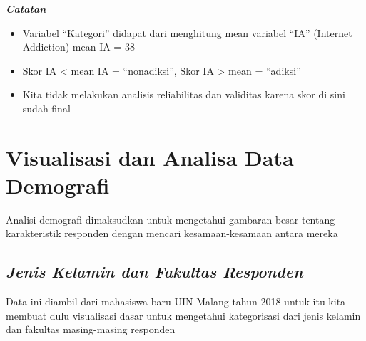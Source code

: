 \documentclass[
]{article}
\providecommand{\tightlist}{%
  \setlength{\itemsep}{0pt}\setlength{\parskip}{0pt}}
\begin{document}
\textbf{\emph{Catatan}}

\begin{itemize}
\tightlist
\item
  Variabel ``Kategori'' didapat dari menghitung mean variabel ``IA''
  (Internet Addiction) mean IA = 38
\item
  Skor IA \textless{} mean IA = ``nonadiksi'', Skor IA \textgreater{}
  mean = ``adiksi''
\item
  Kita tidak melakukan analisis reliabilitas dan validitas karena skor
  di sini sudah final
\end{itemize}

\hypertarget{visualisasi-dan-analisa-data-demografi}{%
\section{\texorpdfstring{\textbf{Visualisasi dan Analisa Data
Demografi}}{Visualisasi dan Analisa Data Demografi}}\label{visualisasi-dan-analisa-data-demografi}}

Analisi demografi dimaksudkan untuk mengetahui gambaran besar tentang
karakteristik responden dengan mencari kesamaan-kesamaan antara mereka

\hypertarget{jenis-kelamin-dan-fakultas-responden}{%
\subsection{\texorpdfstring{\emph{Jenis Kelamin dan Fakultas
Responden}}{Jenis Kelamin dan Fakultas Responden}}\label{jenis-kelamin-dan-fakultas-responden}}

Data ini diambil dari mahasiswa baru UIN Malang tahun 2018 untuk itu
kita membuat dulu visualisasi dasar untuk mengetahui kategorisasi dari
jenis kelamin dan fakultas masing-masing responden
\end{document}
